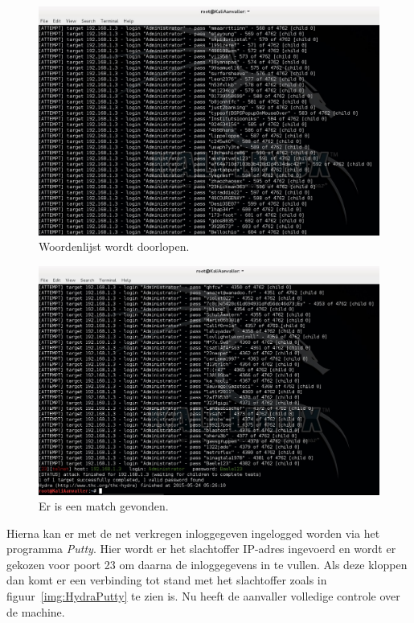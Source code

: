 \documentclass[pdftex,a4paper,12pt]{report}
\begin{document}
\begin{figure}[H]
\begin{center}
\includegraphics[scale=0.40]{img/HydraAanval}
\end{center}
\caption{Woordenlijst wordt doorlopen.}
\label{img:HydraAanval}
\end{figure}

\begin{figure}[H]
\begin{center}
\includegraphics[scale=0.40]{img/HydraGeslaagd}
\end{center}
\caption{Er is een match gevonden.}
\label{img:HydraGeslaagd}
\end{figure}

Hierna kan er met de net verkregen inloggegeven ingelogged worden via het programma \textit{Putty}. Hier wordt er het slachtoffer IP-adres ingevoerd en wordt er gekozen voor poort 23 om daarna de inloggegevens in te vullen. Als deze kloppen dan komt er een verbinding tot stand met het slachtoffer zoals in figuur~\ref{img:HydraPutty} te zien is. Nu heeft de aanvaller volledige controle over de machine.
\end{document}
